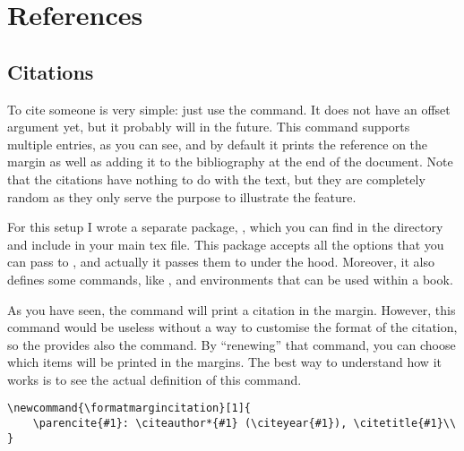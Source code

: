 \chapter{References}

\section{Citations}

To cite someone  is very simple: just 
use the  command. It does 
not have an offset argument yet, but it probably will in the future. 
This command supports multiple entries, as you can see, and by default 
it prints the reference on the margin as well as adding it to the 
bibliography at the end of the document. Note that the citations have 
nothing to do with the text, but they are completely 
random as they only serve the purpose to illustrate the feature.

For this setup I wrote a separate package, , which 
you can find in the  directory and include in your main 
tex file. This package accepts all the options that you can pass to 
, and actually it passes them to  
under the hood. Moreover, it also defines some commands, like 
, and environments that can be used within a 
 book.

As you have seen, the  command will print a citation 
in the margin. However, this command would be useless without a way to 
customise the format of the citation, so the  provides 
also the  command. By \enquote{renewing} 
that command, you can choose which items will be printed in the margins. 
The best way to understand how it works is to see the actual definition 
of this command.

\begin{lstlisting}[style=kaolstplain,linewidth=1.5\textwidth]
\newcommand{\formatmargincitation}[1]{
	\parencite{#1}: \citeauthor*{#1} (\citeyear{#1}), \citetitle{#1}\\
}
\end{lstlisting}

